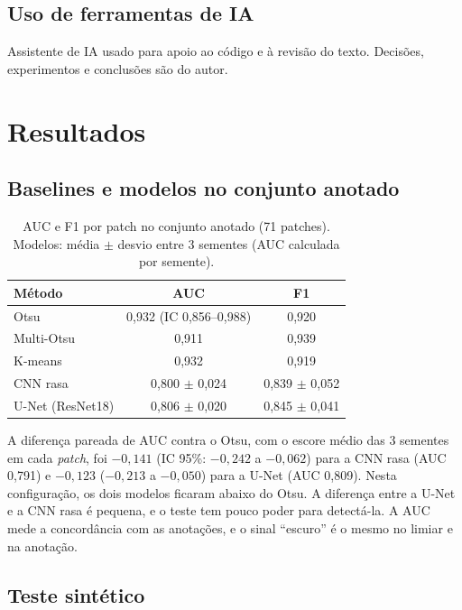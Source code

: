 \documentclass[12pt]{article}
\newif\ifrascunho \rascunhofalse
\newcommand{\fonte}[1]{\ifrascunho\textcolor{blue}{\small(README, #1)}\fi}
\begin{document}
\subsection{Uso de ferramentas de IA}

Assistente de IA usado para apoio ao código e à revisão do texto. Decisões, experimentos e conclusões são do autor.

\section{Resultados}

\subsection{Baselines e modelos no conjunto anotado}

\begin{table}[ht]
\centering
\caption{AUC e F1 por patch no conjunto anotado (71 patches). Modelos: média $\pm$ desvio entre 3 sementes (AUC calculada por semente).}
\label{tab:anotado}
\begin{tabular}{lcc}
\toprule
Método & AUC & F1 \\
\midrule
Otsu & 0,932 (IC 0,856--0,988) & 0,920 \\
Multi-Otsu & 0,911 & 0,939 \\
K-means & 0,932 & 0,919 \\
CNN rasa & 0,800 $\pm$ 0,024 & 0,839 $\pm$ 0,052 \\
U-Net (ResNet18) & 0,806 $\pm$ 0,020 & 0,845 $\pm$ 0,041 \\
\bottomrule
\end{tabular}
\end{table}

A diferença pareada de AUC contra o Otsu, com o escore médio das 3 sementes em cada \textit{patch}, foi $-0{,}141$ (IC 95\%: $-0{,}242$ a $-0{,}062$) para a CNN rasa (AUC 0,791) e $-0{,}123$ ($-0{,}213$ a $-0{,}050$) para a U-Net (AUC 0,809). Nesta configuração, os dois modelos ficaram abaixo do Otsu. A diferença entre a U-Net e a CNN rasa é pequena, e o teste tem pouco poder para detectá-la. A AUC mede a concordância com as anotações, e o sinal ``escuro'' é o mesmo no limiar e na anotação. \fonte{itens 60 a 63; U9, U14}

\subsection{Teste sintético}
\end{document}
